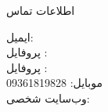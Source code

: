 \documentclass{resume} %
\begin{document}
%


\begin{rSection}{اطلاعات تماس}
\begin{multicols}{2}
ایمیل: \\
پروفایل :  \\
پروفایل :  \\

\vfill\null
\columnbreak
موبایل: 09361819828 \\
وب‌سایت شخصی: \\
%
\end{multicols}
\end{rSection}

\end{document}
